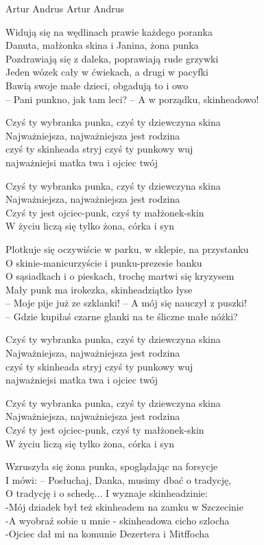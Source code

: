 {Artur Andrus}
{Artur Andrus}
\begin{text}
Widują się na wędlinach prawie każdego poranka\\
Danuta, małżonka skina i Janina, żona punka\\
Pozdrawiają się z daleka, poprawiają rude grzywki\\
Jeden wózek cały w ćwiekach, a drugi w pacyfki\\
Bawią swoje małe dzieci, obgadują to i owo\\
– Pani punkno, jak tam leci? – A w porządku, skinheadowo!

Czyś ty wybranka punka, czyś ty dziewczyna skina\\
Najważniejsza, najważniejsza jest rodzina\\
czyś ty skinheada stryj czyś ty punkowy wuj\\
najważniejsi matka twa i ojciec twój

Czyś ty wybranka punka, czyś ty dziewczyna skina\\
Najważniejsza, najważniejsza jest rodzina\\
Czyś ty jest ojciec-punk, czyś ty małżonek-skin\\
W życiu liczą się tylko żona, córka i syn

Plotkuje się oczywiście w parku, w sklepie, na przystanku\\
O skinie-manicurzyście i punku-prezesie banku\\
O sąsiadkach i o pieskach, trochę martwi się kryzysem\\
Mały punk ma irokezka, skinheadziątko łyse\\
– Moje pije już ze szklanki! – A mój się nauczył z puszki!\\
– Gdzie kupiłaś czarne glanki na te śliczne małe nóżki?

Czyś ty wybranka punka, czyś ty dziewczyna skina\\
Najważniejsza, najważniejsza jest rodzina\\
czyś ty skinheada stryj czyś ty punkowy wuj\\
najważniejsi matka twa i ojciec twój

Czyś ty wybranka punka, czyś ty dziewczyna skina\\
Najważniejsza, najważniejsza jest rodzina\\
Czyś ty jest ojciec-punk, czyś ty małżonek-skin\\
W życiu liczą się tylko żona, córka i syn

Wzruszyła się żona punka, spoglądając na forsycje\\
I mówi: – Posłuchaj, Danka, musimy dbać o tradycję,\\
O tradycję i o schedę... I wyznaje skinheadzinie:\\
-Mój dziadek był też skinheadem na zamku w Szczecinie\\
-A wyobraź sobie u mnie - skinheadowa cicho szlocha\\
-Ojciec dał mi na komunie Dezertera i Mitffocha


\end{text}
